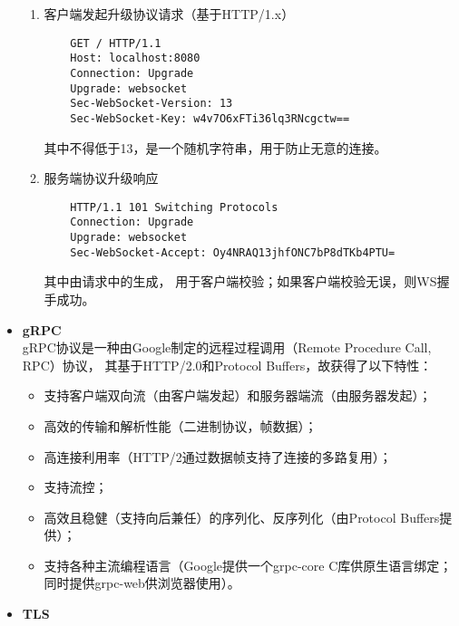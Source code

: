 \begin{itemize}
    \begin{enumerate}
        \item 客户端发起升级协议请求（基于HTTP/1.x）\\
            \begin{lstlisting}
    GET / HTTP/1.1 
    Host: localhost:8080 
    Connection: Upgrade 
    Upgrade: websocket 
    Sec-WebSocket-Version: 13 
    Sec-WebSocket-Key: w4v7O6xFTi36lq3RNcgctw==
            \end{lstlisting}
            其中不得低于13，是一个随机字符串，用于防止无意的连接。
        \item 服务端协议升级响应 \\
            \begin{lstlisting}
    HTTP/1.1 101 Switching Protocols
    Connection: Upgrade
    Upgrade: websocket
    Sec-WebSocket-Accept: Oy4NRAQ13jhfONC7bP8dTKb4PTU=
            \end{lstlisting}
            其中由请求中的生成，
            用于客户端校验；如果客户端校验无误，则WS握手成功。
    \end{enumerate}


    \item \textbf{gRPC} \\

    gRPC协议\cite{grpc}是一种由Google制定的远程过程调用（Remote Procedure Call, RPC）协议，
    其基于HTTP/2.0和Protocol Buffers\cite{protocol-buffers}，故获得了以下特性：

    \begin{itemize}
        \item 支持客户端双向流（由客户端发起）和服务器端流（由服务器发起）；
        \item 高效的传输和解析性能（二进制协议，帧数据）；
        \item 高连接利用率（HTTP/2通过数据帧支持了连接的多路复用）；
        \item 支持流控；
        \item 高效且稳健（支持向后兼任）的序列化、反序列化（由Protocol Buffers提供）；
        \item 支持各种主流编程语言（Google提供一个grpc-core C库供原生语言绑定；同时提供grpc-web供浏览器使用）。
    \end{itemize}

    \item \textbf{TLS} \\


\end{itemize}
